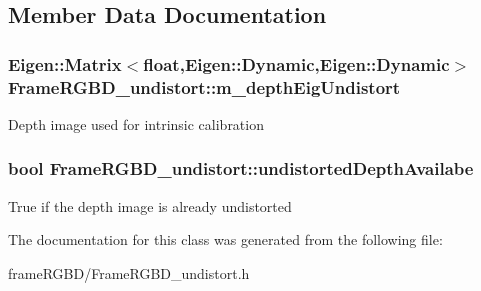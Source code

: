 \subsection{\-Member \-Data \-Documentation}
\hypertarget{classFrameRGBD__undistort_af87ec780215ec12243e54e9a6936c086}{
\subsubsection[{m\-\_\-depth\-Eig\-Undistort}]{\setlength{\rightskip}{0pt plus 5cm}\-Eigen\-::\-Matrix$<$float,\-Eigen\-::\-Dynamic,\-Eigen\-::\-Dynamic$>$ {\bf \-Frame\-R\-G\-B\-D\-\_\-undistort\-::m\-\_\-depth\-Eig\-Undistort}}}\label{classFrameRGBD__undistort_af87ec780215ec12243e54e9a6936c086}
\-Depth image used for intrinsic calibration \hypertarget{classFrameRGBD__undistort_a82a7a6bc0ee7691fc576b41d5e99f0d8}{
\subsubsection[{undistorted\-Depth\-Availabe}]{\setlength{\rightskip}{0pt plus 5cm}bool {\bf \-Frame\-R\-G\-B\-D\-\_\-undistort\-::undistorted\-Depth\-Availabe}}}\label{classFrameRGBD__undistort_a82a7a6bc0ee7691fc576b41d5e99f0d8}
\-True if the depth image is already undistorted 

\-The documentation for this class was generated from the following file\-:\begin{DoxyCompactItemize}
\item 
frame\-R\-G\-B\-D/\-Frame\-R\-G\-B\-D\-\_\-undistort.\-h\end{DoxyCompactItemize}
